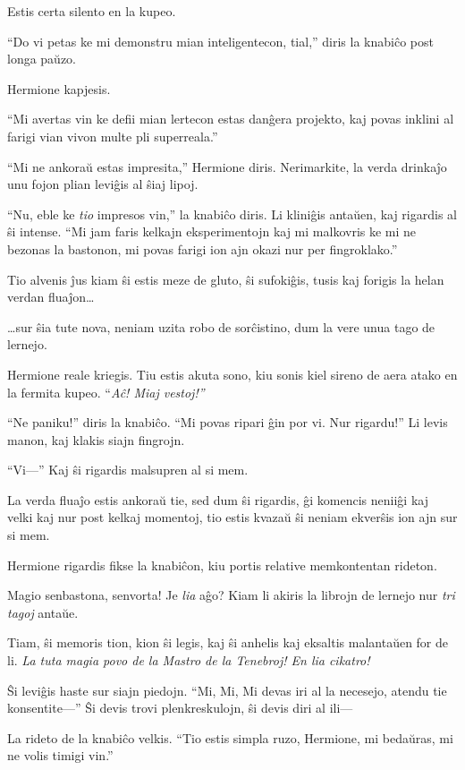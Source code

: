 Estis certa silento en la kupeo.

``Do vi petas ke mi demonstru mian inteligentecon, tial,'' diris la
knabiĉo post longa paŭzo.

Hermione kapjesis.

``Mi avertas vin ke defii mian lertecon estas danĝera projekto, kaj
povas inklini al farigi vian vivon multe pli superreala.''

``Mi ne ankoraŭ estas impresita,'' Hermione diris. Nerimarkite, la
verda drinkaĵo unu fojon plian leviĝis al ŝiaj lipoj.

``Nu, eble ke \emph{tio} impresos vin,'' la knabiĉo diris. Li kliniĝis
antaŭen, kaj rigardis al ŝi intense. ``Mi jam faris kelkajn
eksperimentojn kaj mi malkovris ke mi ne bezonas la bastonon, mi povas
farigi ion ajn okazi nur per fingroklako.''

Tio alvenis ĵus kiam ŝi estis meze de gluto, ŝi sufokiĝis, tusis kaj
forigis la helan verdan fluaĵon\ldots

\ldots{}sur ŝia tute nova, neniam uzita robo de sorĉistino, dum la vere unua
tago de lernejo.

Hermione reale kriegis. Tiu estis akuta sono, kiu sonis kiel sireno de
aera atako en la fermita kupeo. ``\emph{Aĉ! Miaj vestoj!''}

``Ne paniku!'' diris la knabiĉo. ``Mi povas ripari ĝin por vi. Nur
rigardu!'' Li levis manon, kaj klakis siajn fingrojn.

``Vi—'' Kaj ŝi rigardis malsupren al si mem.

La verda fluaĵo estis ankoraŭ tie, sed dum ŝi rigardis, ĝi komencis
neniiĝi kaj velki kaj nur post kelkaj momentoj, tio estis kvazaŭ ŝi
neniam ekverŝis ion ajn sur si mem.

Hermione rigardis fikse la knabiĉon, kiu portis relative memkontentan
rideton.

Magio senbastona, senvorta! Je \emph{lia} aĝo? Kiam li akiris la
librojn de lernejo nur \emph{tri tagoj} antaŭe.

Tiam, ŝi memoris tion, kion ŝi legis, kaj ŝi anhelis kaj eksaltis
malantaŭen for de li. \emph{La tuta magia povo de la Mastro de la
  Tenebroj!  En lia cikatro!}

Ŝi leviĝis haste sur siajn piedojn. ``Mi, Mi, Mi devas iri al la
necesejo, atendu tie konsentite—'' Ŝi devis trovi plenkreskulojn, ŝi
devis diri al ili—

La rideto de la knabiĉo velkis. ``Tio estis simpla ruzo, Hermione, mi
bedaŭras, mi ne volis timigi vin.''

